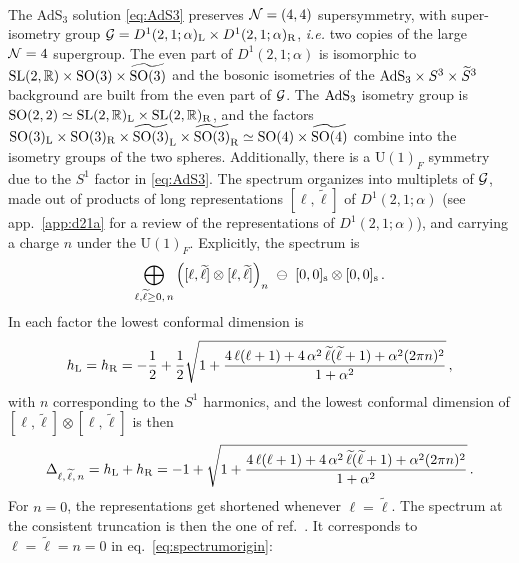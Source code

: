 \documentclass[a4paper, 11pt]{article}
\numberwithin{equation}{section}
\newcommand{\ts}[1]{\widetilde{#1}}
\newcommand{\U}[1]{\mathrm{U}(#1)}
\newcommand{\+}{\oplus}
\begin{document}
\paragraph{}
The AdS$_3$ solution \eqref{eq:AdS3} preserves ${\cal N}=(4,4)$ supersymmetry, with super-isometry group ${\cal G}=D^{1}(2,1;\alpha)_{\rm L}\times D^{1}(2,1;\alpha)_{\rm R}$, \textit{i.e.} two copies of the large ${\cal N}=4$ supergroup. The even part of $D^{1}(2,1;\alpha)$ is isomorphic to ${\rm SL}(2,\mathbb{R})\times{\rm SO}(3)\times\ts{{\rm SO}(3)}$ and the bosonic isometries of the ${\rm AdS}_{3}\times S^{3}\times\ts{S}^{3}$ background are built from the even part of ${\cal G}$. The ${\rm AdS}_{3}$ isometry group is ${\rm SO}(2,2)\simeq{\rm SL}(2,\mathbb{R})_{\rm L}\times{\rm SL}(2,\mathbb{R})_{\rm R}$, and the factors ${\rm SO}(3)_{\rm L}\times{\rm SO}(3)_{\rm R}\times\ts{{\rm SO}(3)}_{\rm L}\times\ts{{\rm SO}(3)}_{\rm R}\simeq{\rm SO}(4)\times\ts{{\rm SO}(4)}$ combine into the isometry groups of the two spheres. Additionally, there is a $\U{1}_F$ symmetry due to the $S^1$ factor in \eqref{eq:AdS3}. The spectrum organizes into multiplets of ${\cal G}$, made out of products of long representations $[\ell,\ts{\ell}]$ of $D^{1}(2,1;\alpha)$ (see app.~\ref{app:d21a} for a review of the representations of $D^{1}(2,1;\alpha)$), and carrying a charge $n$ under the $\U{1}_F$. Explicitly, the spectrum is~\cite{Eberhardt:2017fsi}
\begin{equation} \label{eq:spectrumorigin}
	\bigoplus_{\ell,\ts{\ell}\geq0,\,n} \Big([\ell,\ts{\ell}]\otimes[\ell,\ts{\ell}]\Big)_n \ \ominus\ [0,0]_{\rm s} \otimes [0,0]_{\rm s} \,.
\end{equation}
In each factor the lowest conformal dimension is
\begin{equation}
	h_{\rm L} = h_{\rm R} = -\frac{1}{2} + \frac{1}{2}\sqrt{1+\frac{4\,\ell(\ell+1)+4\,\alpha^{2}\,\ts{\ell}(\ts{\ell}+1)+\alpha^2(2\pi n)^{2}}{1+\alpha^{2}}}\,,
\end{equation}
with $n$ corresponding to the $S^{1}$ harmonics, and the lowest conformal dimension of $[\ell,\ts{\ell}]\otimes[\ell,\ts{\ell}]$ is then
\begin{equation} \label{eq:confdims3s3s1}
	\Delta_{\ell,\,\ts{\ell},\,n} = h_{\rm L} + h_{\rm R} = - 1 + \sqrt{1+\frac{4\,\ell(\ell+1)+4\,\alpha^{2}\,\ts{\ell}(\ts{\ell}+1)+\alpha^2(2\pi n)^{2}}{1+\alpha^{2}}}\,.
\end{equation}
For $n=0$, the representations get shortened whenever $\ell = \ts{\ell}$. The spectrum at the consistent truncation is then the one of ref.~\cite{Hohm:2005ui}. It corresponds to $\ell=\ts{\ell}=n=0$ in eq.~\eqref{eq:spectrumorigin}:
\end{document}
